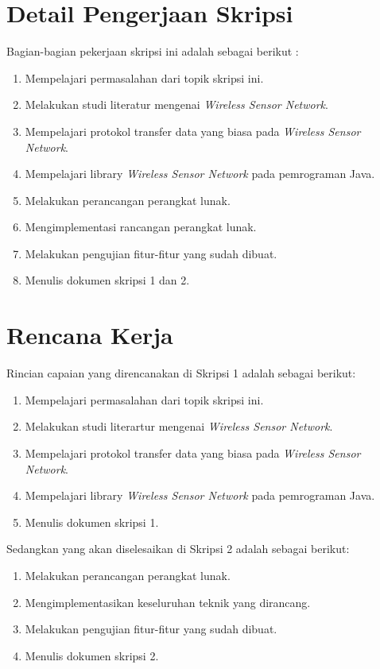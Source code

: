 \documentclass[a4paper,twoside]{article}
\begin{document}
\section{Detail Pengerjaan Skripsi}
Bagian-bagian pekerjaan skripsi ini adalah sebagai berikut :
	\begin{enumerate}
		\item Mempelajari permasalahan dari topik skripsi ini.
		\item Melakukan studi literatur mengenai {\it Wireless Sensor Network}.
		\item Mempelajari protokol transfer data yang biasa pada {\it Wireless Sensor Network}.
		\item Mempelajari library {\it Wireless Sensor Network} pada pemrograman Java.
		\item Melakukan perancangan perangkat lunak.
		\item Mengimplementasi rancangan perangkat lunak.
		\item Melakukan pengujian fitur-fitur yang sudah dibuat.
		\item Menulis dokumen skripsi 1 dan 2.
	\end{enumerate}

\section{Rencana Kerja}
Rincian capaian yang direncanakan di Skripsi 1 adalah sebagai berikut:
\begin{enumerate}
\item Mempelajari permasalahan dari topik skripsi ini.
\item Melakukan studi literartur mengenai {\it Wireless Sensor Network}.
\item Mempelajari protokol transfer data yang biasa pada {\it Wireless Sensor Network}.
\item Mempelajari library {\it Wireless Sensor Network} pada pemrograman Java.
\item Menulis dokumen skripsi 1.
\end{enumerate}

Sedangkan yang akan diselesaikan di Skripsi 2 adalah sebagai berikut:
\begin{enumerate}
\item Melakukan perancangan perangkat lunak.
\item Mengimplementasikan keseluruhan teknik yang dirancang.
\item Melakukan pengujian fitur-fitur yang sudah dibuat.
\item Menulis dokumen skripsi 2.
\end{enumerate}
\end{document}
